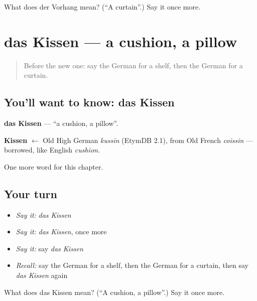 \begin{tcolorbox}[breakable,colback=teal!4,colframe=teal!35!black,title={Before you move on}]
What does der Vorhang mean? (\textquotedblleft{}A curtain\textquotedblright{}.) Say it once more.
\end{tcolorbox}
\section[das Kissen]{das Kissen — a cushion, a pillow}

\label{lesson:GE-C113-kissen}



\begin{quote}
Before the new one: say the German for a shelf, then the German for a curtain.
\end{quote}

\subsection*{You'll want to know: das Kissen}
\textbf{das Kissen} — \textquotedblleft{}a cushion, a pillow\textquotedblright{}.

\begin{cousinweb}
\textbf{Kissen} $\leftarrow$ Old High German \emph{kussīn} (EtymDB 2.1), from Old French \emph{coissin} — borrowed, like English \emph{cushion}.
\end{cousinweb}

\begin{grammarlens}[title={What you've built}]
One more word for this chapter.
\end{grammarlens}

\subsection*{Your turn}
\begin{itemize}
\raggedright
  \item \emph{Say it:} \emph{das Kissen}
  \item \emph{Say it:} \emph{das Kissen}, once more
  \item \emph{Say it:} say \emph{das Kissen}
  \item \emph{Recall:} say the German for a shelf, then the German for a curtain, then say \emph{das Kissen} again
\end{itemize}

\begin{tcolorbox}[breakable,colback=teal!4,colframe=teal!35!black,title={Before you move on}]
What does das Kissen mean? (\textquotedblleft{}A cushion, a pillow\textquotedblright{}.) Say it once more.
\end{tcolorbox}
